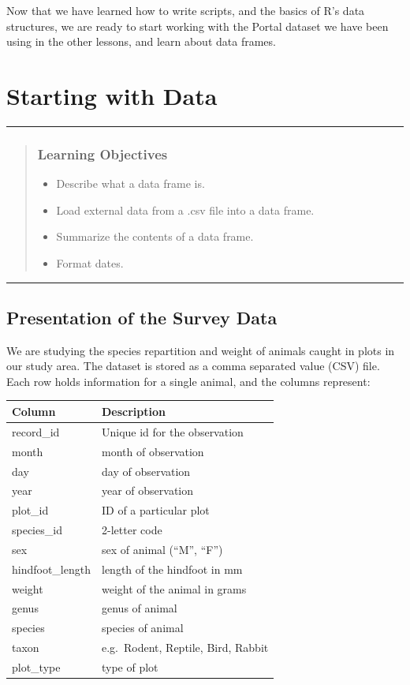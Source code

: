 \documentclass[]{book}
\providecommand{\tightlist}{%
  \setlength{\itemsep}{0pt}\setlength{\parskip}{0pt}}
\begin{document}
Now that we have learned how to write scripts, and the basics of R's
data structures, we are ready to start working with the Portal dataset
we have been using in the other lessons, and learn about data frames.

\chapter{Starting with Data}\label{starting-with-data}

\begin{center}\rule{0.5\linewidth}{\linethickness}\end{center}

\begin{quote}
\subsection{Learning Objectives}\label{learning-objectives-2}

\begin{itemize}
\tightlist
\item
  Describe what a data frame is.
\item
  Load external data from a .csv file into a data frame.
\item
  Summarize the contents of a data frame.
\item
  Format dates.
\end{itemize}
\end{quote}

\begin{center}\rule{0.5\linewidth}{\linethickness}\end{center}

\section{Presentation of the Survey
Data}\label{presentation-of-the-survey-data}

We are studying the species repartition and weight of animals caught in
plots in our study area. The dataset is stored as a comma separated
value (CSV) file. Each row holds information for a single animal, and
the columns represent:

\begin{longtable}[]{@{}ll@{}}
\toprule
Column & Description\tabularnewline
\midrule
\endhead
record\_id & Unique id for the observation\tabularnewline
month & month of observation\tabularnewline
day & day of observation\tabularnewline
year & year of observation\tabularnewline
plot\_id & ID of a particular plot\tabularnewline
species\_id & 2-letter code\tabularnewline
sex & sex of animal (``M'', ``F'')\tabularnewline
hindfoot\_length & length of the hindfoot in mm\tabularnewline
weight & weight of the animal in grams\tabularnewline
genus & genus of animal\tabularnewline
species & species of animal\tabularnewline
taxon & e.g.~Rodent, Reptile, Bird, Rabbit\tabularnewline
plot\_type & type of plot\tabularnewline
\bottomrule
\end{longtable}
\end{document}
